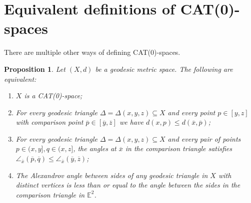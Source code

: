 \documentclass[11pt, a4paper, oneside]{memoir}
\theoremstyle{plain}\newtheorem{theorem}[subsection]{Theorem}
\newtheorem{proposition}[subsection]{Proposition}
\theoremstyle{definition}
\newcommand{\parenum}{\setenumerate[1]{label=\textbf{(\arabic*)}}}
\newcommand{\E}{\mathbb{E}}
\begin{document}
\section{Equivalent definitions of CAT(0)-spaces}
There are multiple other ways of defining CAT(0)-spaces.
\begin{proposition}\label{prop:equiv}
Let \((X,d)\) be a geodesic metric space.
The following are equivalent:
\parenum
\begin{enumerate}
    \item \(X\) is a CAT(0)-space;
    \item For every geodesic triangle \(\Delta=\Delta(x,y,z)\subseteq X\) and every point \(p\in [y,z]\) with comparison point \(\overline{p}\in [\overline{y},\overline{z}]\) we have \(d(x,p)\leq d(\overline{x},\overline{p})\);
    \item For every geodesic triangle \(\Delta=\Delta(x,y,z)\subseteq X\) and every pair of points \(p\in (x,y],q\in (x,z]\), the angles at \(\overline{x}\) in the comparison triangle satisfies \(\angle_{\overline{x}}(\overline{p},\overline{q})\leq\angle_{\overline{x}}(\overline{y},\overline{z})\);
    \item The Alexandrov angle between sides of any geodesic triangle in \(X\) with distinct vertices is less than or equal to the angle between the sides in the comparison triangle in \(\E^2\). 
\end{enumerate}
\end{proposition}
\end{document}

